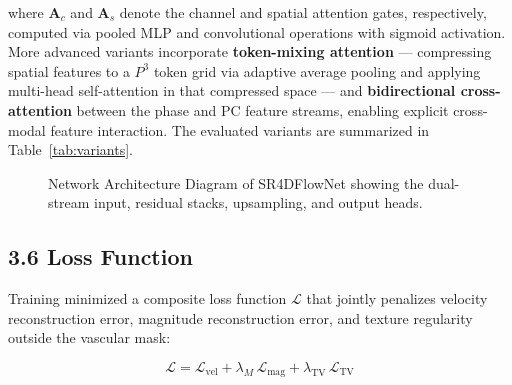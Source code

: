 where $\mathbf{A}_c$ and $\mathbf{A}_s$ denote the channel and spatial attention gates, respectively, computed via pooled MLP and convolutional operations with sigmoid activation. More advanced variants incorporate \textbf{token-mixing attention} \cite{vaswani2017attention} --- compressing spatial features to a $P^3$ token grid via adaptive average pooling and applying multi-head self-attention in that compressed space --- and \textbf{bidirectional cross-attention} between the phase and PC feature streams, enabling explicit cross-modal feature interaction. The evaluated variants are summarized in Table~\ref{tab:variants}.

\begin{figure}[h]
    \centering
    \caption{Network Architecture Diagram of SR4DFlowNet showing the dual-stream input, residual stacks, upsampling, and output heads.}
    \label{fig:architecture}
\end{figure}

\begin{table}[h]
    \centering
    \caption{Summary of evaluated SR4DFlowNet architectural variants and their attention components.}
    \label{tab:variants}
\end{table}

\subsection*{3.6 Loss Function}

Training minimized a composite loss function $\mathcal{L}$ that jointly penalizes velocity reconstruction error, magnitude reconstruction error, and texture regularity outside the vascular mask:

\begin{equation}
    \boxed{\mathcal{L} = \mathcal{L}_{\text{vel}} + \lambda_M \, \mathcal{L}_{\text{mag}} + \lambda_{\text{TV}} \, \mathcal{L}_{\text{TV}}}
\end{equation}

